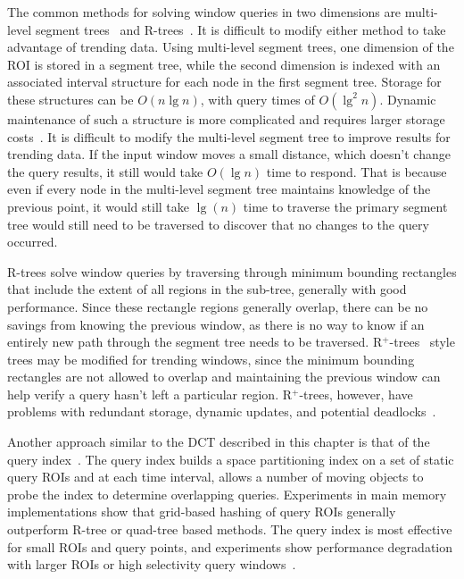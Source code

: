 \documentclass{ucdthesis}       %
\begin{document}
The common methods for solving window queries in two dimensions are
multi-level segment trees~\cite{berg00comput-geomet} and
R-trees~\cite{guttm84r-tree}.  It is difficult to modify either method
to take advantage of trending data.  Using multi-level segment trees,
one dimension of the \ac{ROI} is stored in a segment tree, while the
second dimension is indexed with an associated interval structure for
each node in the first segment tree.  Storage for these structures can
be $O(n\lg{n})$, with query times of $O(\lg^2{n})$.  Dynamic
maintenance of such a structure is more complicated and requires
larger storage costs~\cite{krevel88concat-segmen}.  It is difficult to
modify the multi-level segment tree to improve results for trending
data.  If the input window moves a small distance, which doesn't
change the query results, it still would take $O(\lg{n})$ time to
respond.  That is because even if every node in the multi-level
segment tree maintains knowledge of the previous point, it would still
take $\lg({n})$ time to traverse the primary segment tree would still
need to be traversed to discover that no changes to the query
occurred.

R-trees solve window queries by traversing through minimum bounding
rectangles that include the extent of all regions in the sub-tree,
generally with good performance.  Since these rectangle regions
generally overlap, there can be no savings from knowing the previous
window, as there is no way to know if an entirely new path through the
segment tree needs to be traversed.  R$^+$-trees~\cite{sellis87r-tree}
style trees may be modified for trending windows, since the minimum
bounding rectangles are not allowed to overlap and maintaining the
previous window can help verify a query hasn't left a particular
region.  R$^+$-trees, however, have problems with redundant storage,
dynamic updates, and potential deadlocks~\cite{manol03r-have}.

Another approach similar to the \ac{DCT} described in this chapter is that
of the query index~\cite{kalas04main-memor, prabhakar02qindex}.  The
query index builds a space partitioning index on a set of static query
\acp{ROI} and at each time interval, allows a number of moving objects
to probe the index to determine overlapping queries.  Experiments in
main memory implementations show that grid-based hashing of query
\acp{ROI} generally outperform R-tree or quad-tree based methods.  The
query index is most effective for small \acp{ROI} and query points, and
experiments show performance degradation with larger \acp{ROI} or high
selectivity query windows~\cite{kim01optim}.
\end{document}
